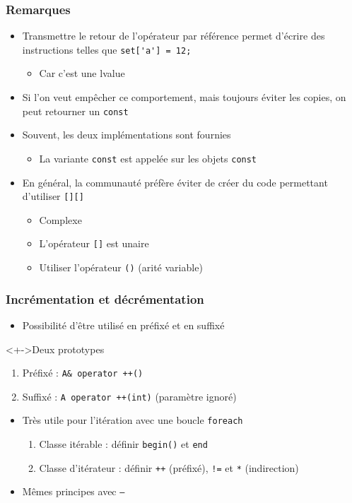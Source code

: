 \begin{frame}
\frametitle{Remarques}
\begin{itemize}[<+->]
\item Transmettre le retour de l'opérateur par référence permet d'écrire des instructions telles que \lstinline|set['a'] = 12;|
	\begin{itemize}
	\item Car c'est une lvalue
	\end{itemize}
\item Si l'on veut empêcher ce comportement, mais toujours éviter les copies, on peut retourner un \lstinline|const|
\item Souvent, les deux implémentations sont fournies
	\begin{itemize}
	\item La variante \lstinline|const| est appelée sur les objets \lstinline|const|
	\end{itemize}
\item En général, la communauté préfère éviter de créer du code permettant d'utiliser \lstinline|[][]|
	\begin{itemize}
	\item Complexe		
	\item L'opérateur \lstinline|[]| est unaire
	\item Utiliser l'opérateur \lstinline|()| (arité variable)
	\end{itemize}
\end{itemize}
\end{frame}

\begin{frame}
\frametitle{Incrémentation et décrémentation}
\begin{itemize}[<+->]
\item Possibilité d'être utilisé en préfixé et en suffixé
\end{itemize}
\begin{exampleblock}<+->{Deux prototypes}
	\begin{enumerate}[<+->]
	\item Préfixé : \lstinline|A& operator ++()|
	\item Suffixé : \lstinline|A operator ++(int)| (paramètre ignoré)
	\end{enumerate}
\end{exampleblock}
\begin{itemize}[<+->]
\item Très utile pour l'itération avec une boucle \texttt{foreach}
	\begin{enumerate}
	\item Classe itérable : définir \texttt{begin()} et \texttt{end}
	\item Classe d'itérateur : définir \texttt{++} (préfixé), \texttt{!=} et \texttt{*} (indirection)
	\end{enumerate}
\item Mêmes principes avec \texttt{--}
\end{itemize}
\end{frame}

